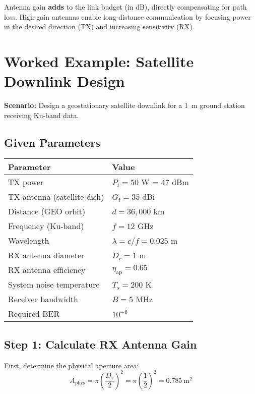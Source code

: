 \begin{keyconcept}
Antenna gain \textbf{adds} to the link budget (in dB), directly compensating for path loss. High-gain antennas enable long-distance communication by focusing power in the desired direction (TX) and increasing sensitivity (RX).
\end{keyconcept}

\section{Worked Example: Satellite Downlink Design}

\textbf{Scenario:} Design a geostationary satellite downlink for a 1~m ground station receiving Ku-band data.

\subsection*{Given Parameters}

\begin{tabular}{@{}ll@{}}
\toprule
\textbf{Parameter} & \textbf{Value} \\
\midrule
TX power & $P_t = 50$ W = 47 dBm \\
TX antenna (satellite dish) & $G_t = 35$ dBi \\
Distance (GEO orbit) & $d = 36{,}000$ km \\
Frequency (Ku-band) & $f = 12$ GHz \\
Wavelength & $\lambda = c/f = 0.025$ m \\
RX antenna diameter & $D_r = 1$ m \\
RX antenna efficiency & $\eta_{\text{ap}} = 0.65$ \\
System noise temperature & $T_s = 200$ K \\
Receiver bandwidth & $B = 5$ MHz \\
Required BER & $10^{-6}$ \\
\bottomrule
\end{tabular}

\subsection*{Step 1: Calculate RX Antenna Gain}

First, determine the physical aperture area:
\begin{equation}
A_{\text{phys}} = \pi \left(\frac{D_r}{2}\right)^2 = \pi \left(\frac{1}{2}\right)^2 = 0.785\ \text{m}^2
\end{equation}

